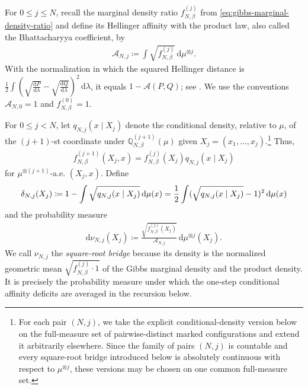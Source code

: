 \documentclass[11pt,reqno]{amsart}
\numberwithin{equation}{section}
\theoremstyle{plain}
\theoremstyle{remark}
\DeclarePairedDelimiter{\pa}{\lparen}{\rparen}
\newcommand{\md}{\mathrm{d}}
\newcommand{\Q}{{\mathbb{Q}}}
\newcommand{\be}{\beta}
\begin{document}
For \(0\le j\le N\), recall the marginal density ratio \(f_{N,\be}^{(j)}\) from \eqref{eq:gibbs-marginal-density-ratio} and define its Hellinger affinity with the product law, also called the Bhattacharyya coefficient, by
\begin{align}\label{eq:uv-critical-affinity-def}
 \mathcal A_{N,j}
 \coloneqq
 \int\sqrt{f_{N,\be}^{(j)}}\,\md\mu^{\otimes j}.
\end{align}
With the normalization in which the squared Hellinger distance is \(\frac12\int\left(\sqrt{\frac{\md P}{\md\lambda}}-\sqrt{\frac{\md Q}{\md\lambda}}\right)^2\,\md\lambda\), it equals \(1-\mathcal A(P,Q)\); see \cite[Section~2.4, pp.~83--86]{Tsybakov2009}.  We use the conventions \(\mathcal A_{N,0}=1\) and \(f_{N,\be}^{(0)}=1\).

For \(0\le j<N\), let \(q_{N,j}(x\mid X_j)\) denote the conditional density, relative to \(\mu\), of the \((j+1)\)-st coordinate under \(\Q_{N,\be}^{(j+1)}(\mu)\) given \(X_j=(x_1,\ldots,x_j)\).\footnote{For each pair \((N,j)\), we take the explicit conditional-density version below on the full-measure set of pairwise-distinct marked configurations and extend it arbitrarily elsewhere.  Since the family of pairs \((N,j)\) is countable and every square-root bridge introduced below is absolutely continuous with respect to \(\mu^{\otimes j}\), these versions may be chosen on one common full-measure set.}  Thus,
\begin{align}\label{eq:uv-critical-conditional-density-chain}
 f_{N,\be}^{(j+1)}(X_j,x)
 =f_{N,\be}^{(j)}(X_j)q_{N,j}(x\mid X_j)
\end{align}
for \(\mu^{\otimes(j+1)}\)-a.e. \((X_j,x)\).  Define
\begin{align}\label{eq:uv-critical-conditional-affinity-deficit}
 \delta_{N,j}(X_j)
 \coloneqq
 1-\int\sqrt{q_{N,j}(x\mid X_j)}\,\md\mu(x)
 =\frac12\int\pa{\sqrt{q_{N,j}(x\mid X_j)}-1}^2\,\md\mu(x)
\end{align}
and the probability measure
\begin{align}\label{eq:uv-critical-bridge-measure}
 \md\nu_{N,j}(X_j)
 \coloneqq
 \frac{\sqrt{f_{N,\be}^{(j)}(X_j)}}{\mathcal A_{N,j}}\,
 \md\mu^{\otimes j}(X_j).
\end{align}
We call \(\nu_{N,j}\) the \emph{square-root bridge} because its density is the normalized geometric mean \(\sqrt{f_{N,\be}^{(j)}\cdot1}\) of the Gibbs marginal density and the product density.  It is precisely the probability measure under which the one-step conditional affinity deficits are averaged in the recursion below.
\end{document}
